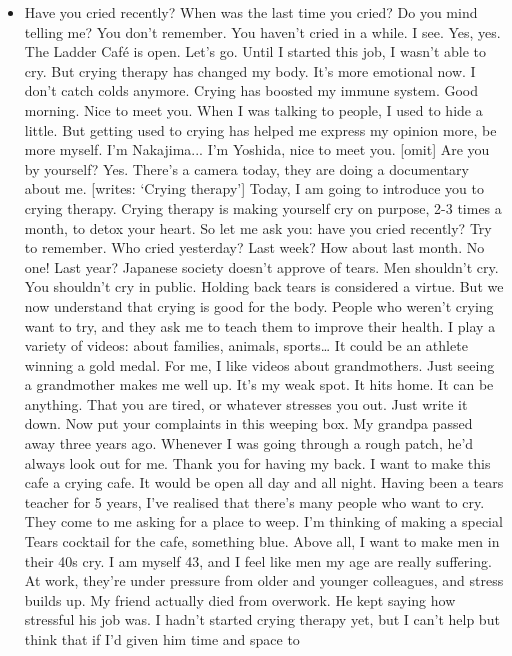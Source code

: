 \begin{itemize}
\tightlist
\item
  Have you cried recently? When was the last time you cried? Do you mind
  telling me? You don't remember. You haven't cried in a while. I see.
  Yes, yes. The Ladder Café is open. Let's go. Until I started this job,
  I wasn't able to cry. But crying therapy has changed my body. It's
  more emotional now. I don't catch colds anymore. Crying has boosted my
  immune system. Good morning. Nice to meet you. When I was talking to
  people, I used to hide a little. But getting used to crying has helped
  me express my opinion more, be more myself. I'm Nakajima... I'm
  Yoshida, nice to meet you. {[}omit{]} Are you by yourself? Yes.
  There's a camera today, they are doing a documentary about me.
  {[}writes: `Crying therapy'{]} Today, I am going to introduce you to
  crying therapy. Crying therapy is making yourself cry on purpose, 2-3
  times a month, to detox your heart. So let me ask you: have you cried
  recently? Try to remember. Who cried yesterday? Last week? How about
  last month. No one! Last year? Japanese society doesn't approve of
  tears. Men shouldn't cry. You shouldn't cry in public. Holding back
  tears is considered a virtue. But we now understand that crying is
  good for the body. People who weren't crying want to try, and they ask
  me to teach them to improve their health. I play a variety of videos:
  about families, animals, sports\ldots{} It could be an athlete winning
  a gold medal. For me, I like videos about grandmothers. Just seeing a
  grandmother makes me well up. It's my weak spot. It hits home. It can
  be anything. That you are tired, or whatever stresses you out. Just
  write it down. Now put your complaints in this weeping box. My grandpa
  passed away three years ago. Whenever I was going through a rough
  patch, he'd always look out for me. Thank you for having my back. I
  want to make this cafe a crying cafe. It would be open all day and all
  night. Having been a tears teacher for 5 years, I've realised that
  there's many people who want to cry. They come to me asking for a
  place to weep. I'm thinking of making a special Tears cocktail for the
  cafe, something blue. Above all, I want to make men in their 40s cry.
  I am myself 43, and I feel like men my age are really suffering. At
  work, they're under pressure from older and younger colleagues, and
  stress builds up. My friend actually died from overwork. He kept
  saying how stressful his job was. I hadn't started crying therapy yet,
  but I can't help but think that if I'd given him time and space to

\end{itemize}
